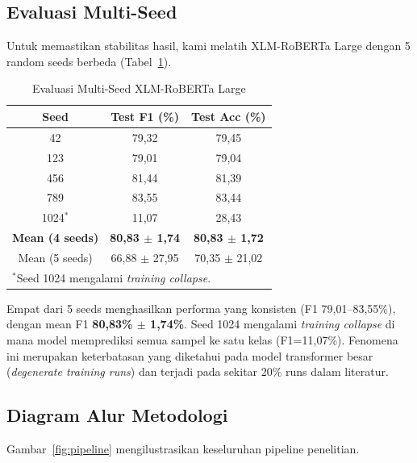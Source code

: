 \documentclass[10pt,twocolumn]{article}
\begin{document}
\subsection{Evaluasi Multi-Seed}

Untuk memastikan stabilitas hasil, kami melatih XLM-RoBERTa Large dengan 5 random seeds berbeda (Tabel~\ref{tab:multiseed}).

\begin{table}[H]
\centering
\caption{Evaluasi Multi-Seed XLM-RoBERTa Large}
\label{tab:multiseed}
\begin{tabular}{ccc}
\toprule
\textbf{Seed} & \textbf{Test F1 (\%)} & \textbf{Test Acc (\%)} \\
\midrule
42 & 79,32 & 79,45 \\
123 & 79,01 & 79,04 \\
456 & 81,44 & 81,39 \\
789 & 83,55 & 83,44 \\
1024$^*$ & 11,07 & 28,43 \\
\midrule
\textbf{Mean (4 seeds)} & \textbf{80,83 $\pm$ 1,74} & \textbf{80,83 $\pm$ 1,72} \\
Mean (5 seeds) & 66,88 $\pm$ 27,95 & 70,35 $\pm$ 21,02 \\
\bottomrule
\multicolumn{3}{l}{\footnotesize $^*$Seed 1024 mengalami \textit{training collapse}.} \\
\end{tabular}
\end{table}

Empat dari 5 seeds menghasilkan performa yang konsisten (F1 79,01--83,55\%), dengan mean F1 \textbf{80,83\% $\pm$ 1,74\%}. Seed 1024 mengalami \textit{training collapse} di mana model memprediksi semua sampel ke satu kelas (F1=11,07\%). Fenomena ini merupakan keterbatasan yang diketahui pada model transformer besar (\textit{degenerate training runs}) dan terjadi pada sekitar 20\% runs dalam literatur.

\subsection{Diagram Alur Metodologi}

Gambar~\ref{fig:pipeline} mengilustrasikan keseluruhan pipeline penelitian.
\end{document}
